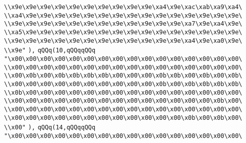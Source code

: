 \verb|\\x9e\x9e\x9e\x9e\x9e\x9e\x9e\x9e\x9e\x9e\xa4\x9e\xac\xab\xa9\xa4\|\newline
\verb|\\xa4\x9e\x9e\x9e\x9e\x9e\x9e\x9e\x9e\x9e\x9e\x9e\x9e\x9e\x9e\x9e\|\newline
\verb|\\x9e\x9e\x9e\x9e\x9e\x9e\x9e\x9e\x9e\x9e\x9e\x9e\xa7\x9e\xa4\x9e\|\newline
\verb|\\xa5\x9e\x9e\x9e\x9e\x9e\x9e\x9e\x9e\x9e\x9e\x9e\x9e\x9e\x9e\x9e\|\newline
\verb|\\x9e\x9e\x9e\x9e\x9e\x9e\x9e\x9e\x9e\x9e\x9e\x9e\xa4\x9e\xa0\x9e\|\newline
\verb|\\x9e"|\newline
\verb|),|\newline
\verb|qQQq(10,qQQqqQQq|\newline
\verb|"\x00\x00\x00\x00\x00\x00\x00\x00\x00\x00\x00\x00\x00\x00\x00\x00\|\newline
\verb|\\x00\x00\x00\x00\x00\x00\x00\x00\x00\x00\x00\x00\x00\x00\x00\x00\|\newline
\verb|\\x00\x0b\x00\x0b\x0b\x0b\x0b\x00\x00\x00\x0b\x0b\x00\x0b\x00\x0b\|\newline
\verb|\\x00\x00\x00\x00\x00\x00\x00\x00\x00\x00\x0b\x00\x0b\x0b\x0b\x0b\|\newline
\verb|\\x0b\x00\x00\x00\x00\x00\x00\x00\x00\x00\x00\x00\x00\x00\x00\x00\|\newline
\verb|\\x00\x00\x00\x00\x00\x00\x00\x00\x00\x00\x00\x00\x00\x00\x0b\x00\|\newline
\verb|\\x00\x00\x00\x00\x00\x00\x00\x00\x00\x00\x00\x00\x00\x00\x00\x00\|\newline
\verb|\\x00\x00\x00\x00\x00\x00\x00\x00\x00\x00\x00\x00\x0b\x00\x0b\x00\|\newline
\verb|\\x00"|\newline
\verb|),|\newline
\verb|qQQq(14,qQQqqQQq|\newline
\verb|"\x00\x00\x00\x00\x00\x00\x00\x00\x00\x00\x00\x00\x00\x00\x00\x00\|\newline
